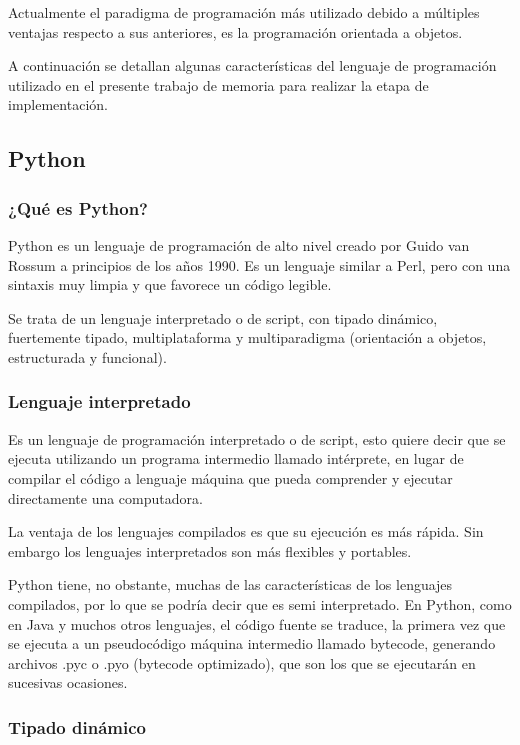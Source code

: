 \documentclass[12pt,legalpaper]{report}
\begin{document}
Actualmente el paradigma de programación más utilizado debido a múltiples ventajas respecto a sus anteriores, es la programación orientada a objetos.

A continuación se detallan algunas características del lenguaje de programación utilizado en el presente trabajo de memoria para realizar la etapa de implementación.

		\subsection{Python}

			\subsubsection{¿Qué es Python?}

Python es un lenguaje de programación de alto nivel creado por Guido van Rossum a principios de los años 1990.  Es un lenguaje similar a Perl, pero con una sintaxis muy limpia y que favorece un código legible.

Se trata de un lenguaje interpretado o de script, con tipado dinámico, fuertemente tipado, multiplataforma y multiparadigma (orientación a objetos, estructurada y funcional).

			\subsubsection{Lenguaje interpretado}

Es un lenguaje de programación interpretado o de script, esto quiere decir que se ejecuta utilizando un programa intermedio llamado intérprete, en lugar de compilar el código a lenguaje máquina que pueda comprender y ejecutar directamente una computadora.

La ventaja de los lenguajes compilados es que su ejecución es más rápida. Sin embargo los lenguajes interpretados son más flexibles y portables.

Python tiene, no obstante, muchas de las características de los lenguajes compilados, por lo que se podría decir que es semi interpretado. En Python, como en Java y muchos otros lenguajes, el código fuente se traduce, la primera vez que se ejecuta a un pseudocódigo máquina intermedio llamado bytecode, generando archivos .pyc o .pyo (bytecode optimizado), que son los que se ejecutarán en sucesivas ocasiones.


			\subsubsection{Tipado dinámico}
\end{document}
